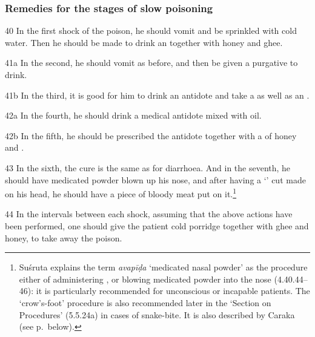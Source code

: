 \begin{translation}
    \subsubsection{Remedies for the stages of slow poisoning}
    \item[40]
    In the first shock of the poison, he should vomit and be sprinkled with cold
    water. Then he should be made to drink an  together
    with honey and ghee.
    \item[41a]
    In the second, he should vomit as before, and then be given a purgative to
    drink.
    \item[41b]
    In the third, it is good for him to drink an antidote and take a
     as well as an .
    \item[42a]
    In the fourth, he should drink a medical antidote mixed with oil.
    \item[42b]
    In the fifth, he should be prescribed the antidote together with a
     of honey and
    .
    \item[43]
    In the sixth, the cure is the same as for diarrhoea.
    And in the seventh, he should have medicated powder blown up his nose, and
    after having a `' cut made on his head, he
    should have a piece of bloody meat put on
    it.\footnote{\label{su:kakapada}Suśruta explains the term \emph{avapīḍa}
    `medicated nasal powder' as the procedure either of administering
    , or blowing medicated powder into the nose
    (4.40.44--46): it is particularly recommended for unconscious or incapable
    patients.  The `crow's-foot' procedure is also recommended later in the
    `Section on Procedures' (5.5.24a) in cases of snake-bite. It is also
    described by Caraka (see p.\,\pageref{sa:kakapada} below).}
    
    \item[44]
    In the intervals between each shock, assuming that the above actions have
    been performed, one should give the patient cold porridge together with ghee
    and honey, to take away the poison.
    

\end{translation}
